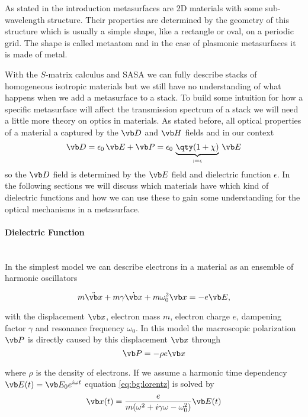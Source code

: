 As stated in the introduction metasurfaces are 2D materials with some sub-wavelength structure. Their properties are determined by the geometry of this structure which is usually a simple shape, like a rectangle or oval, on a periodic grid. The shape is called metaatom and in the case of plasmonic metasurfaces it is made of metal.

\indent
With the $S$-matrix calculus and SASA we can fully describe stacks of homogeneous isotropic materials but we still have no understanding of what happens when we add a metasurface to a stack. To build some intuition for how a specific metasurface will affect the transmission spectrum of a stack we will need a little more theory on optics in materials. As stated before, all optical properties of a material a captured by the $\vb D$ and $\vb H$ fields and in our context
\begin{equation} \label{eq:bg:D}
    \vb D = 
    \epsilon_0 \, \vb E + \vb P =
    \epsilon_0\, \underbrace{\qty(1 + \chi)}_{
         := \epsilon
    }\, \vb E
\end{equation}
so the $\vb D$ field is determined by the $\vb E$ field and dielectric function $\epsilon$. In the following sections we will discuss which materials have which kind of dielectric functions and how we can use these to gain some understanding for the optical mechanisms in a metasurface.

\paragraph{Dielectric Function}~\\
In the simplest model we can describe electrons in a material as an ensemble of harmonic oscillators

\begin{equation} \label{eq:bg:lorentz}
    m \ddot{\vb x} + m \gamma \dot{\vb x} + m \omega_0^2 \vb x = -e \vb E,
\end{equation}

with the displacement $\vb x$, electron mass $m$, electron charge $e$, dampening factor $\gamma$ and resonance frequency $\omega_0$.
In this model the macroscopic polarization $\vb P$ is directly caused by this displacement $\vb x$ through
\begin{equation} \label{eq:bg:P}
    \vb P = - \rho e \vb x
\end{equation}

where $\rho$ is the density of electrons.
If we assume a harmonic time dependency $\vb E(t) = \vb E_0 e^{i \omega t}$ equation \eqref{eq:bg:lorentz} is solved by 
\begin{equation}
    \vb x(t) = \frac{e}{m(\omega^2 + i \gamma \omega - \omega_0^2)} \vb E(t)
\end{equation}

